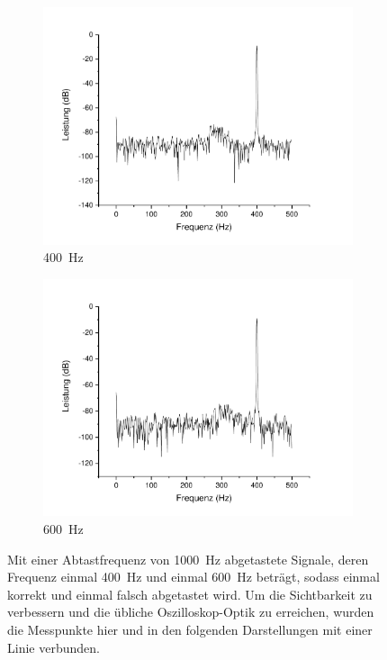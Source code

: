 \documentclass[
a4paper,
12pt,
pagesize,
ngerman
]{scrartcl}
\begin{document}
	\begin{figure}[H]
		\centering
		\begin{subfigure}[t]{0.495\textwidth}
			\centering
			\includegraphics[width=1\textwidth]{Origin-Files/aliasing_abtast1000bei400sig}
			\caption{\SI{400}{\hertz}}
		\end{subfigure}
		\begin{subfigure}[t]{0.495\textwidth}
			\centering
			\includegraphics[width=1\textwidth]{Origin-Files/aliasing_abtast1000bei600sig}
			\caption{\SI{600}{\hertz}}
		\end{subfigure}
		
		\caption{Mit einer Abtastfrequenz von \SI{1000}{\hertz} abgetastete Signale, deren Frequenz einmal \SI{400}{\hertz} und einmal \SI{600}{\hertz} beträgt, sodass einmal korrekt und einmal falsch abgetastet wird. Um die Sichtbarkeit zu verbessern und die übliche Oszilloskop-Optik zu erreichen, wurden die Messpunkte hier und in den folgenden Darstellungen mit einer Linie verbunden.} %
		\label{fig_ali}
		\centering
	\end{figure}
	
\end{document}
